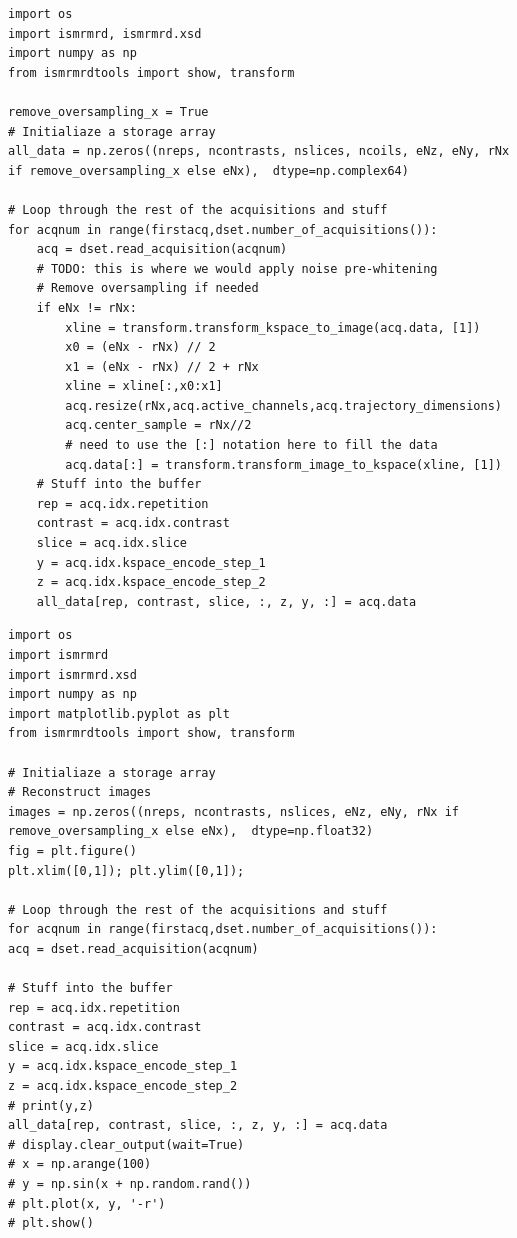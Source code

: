 \begin{latin}
\begin{lstlisting}
import os
import ismrmrd, ismrmrd.xsd
import numpy as np
from ismrmrdtools import show, transform

remove_oversampling_x = True
# Initialiaze a storage array
all_data = np.zeros((nreps, ncontrasts, nslices, ncoils, eNz, eNy, rNx if remove_oversampling_x else eNx),  dtype=np.complex64)

# Loop through the rest of the acquisitions and stuff
for acqnum in range(firstacq,dset.number_of_acquisitions()):
	acq = dset.read_acquisition(acqnum)
	# TODO: this is where we would apply noise pre-whitening
	# Remove oversampling if needed
	if eNx != rNx:
		xline = transform.transform_kspace_to_image(acq.data, [1])
		x0 = (eNx - rNx) // 2
		x1 = (eNx - rNx) // 2 + rNx
		xline = xline[:,x0:x1]
		acq.resize(rNx,acq.active_channels,acq.trajectory_dimensions)
		acq.center_sample = rNx//2
		# need to use the [:] notation here to fill the data
		acq.data[:] = transform.transform_image_to_kspace(xline, [1])
	# Stuff into the buffer
	rep = acq.idx.repetition
	contrast = acq.idx.contrast
	slice = acq.idx.slice
	y = acq.idx.kspace_encode_step_1
	z = acq.idx.kspace_encode_step_2
	all_data[rep, contrast, slice, :, z, y, :] = acq.data
\end{lstlisting}
\end{latin}




\begin{latin}
\begin{lstlisting}
import os
import ismrmrd
import ismrmrd.xsd
import numpy as np
import matplotlib.pyplot as plt
from ismrmrdtools import show, transform

# Initialiaze a storage array
# Reconstruct images
images = np.zeros((nreps, ncontrasts, nslices, eNz, eNy, rNx if remove_oversampling_x else eNx),  dtype=np.float32)
fig = plt.figure()
plt.xlim([0,1]); plt.ylim([0,1]);

# Loop through the rest of the acquisitions and stuff
for acqnum in range(firstacq,dset.number_of_acquisitions()):
acq = dset.read_acquisition(acqnum)

# Stuff into the buffer
rep = acq.idx.repetition
contrast = acq.idx.contrast
slice = acq.idx.slice
y = acq.idx.kspace_encode_step_1
z = acq.idx.kspace_encode_step_2
# print(y,z)
all_data[rep, contrast, slice, :, z, y, :] = acq.data
# display.clear_output(wait=True)
# x = np.arange(100)
# y = np.sin(x + np.random.rand())
# plt.plot(x, y, '-r')
# plt.show()
\end{lstlisting}
\end{latin}




